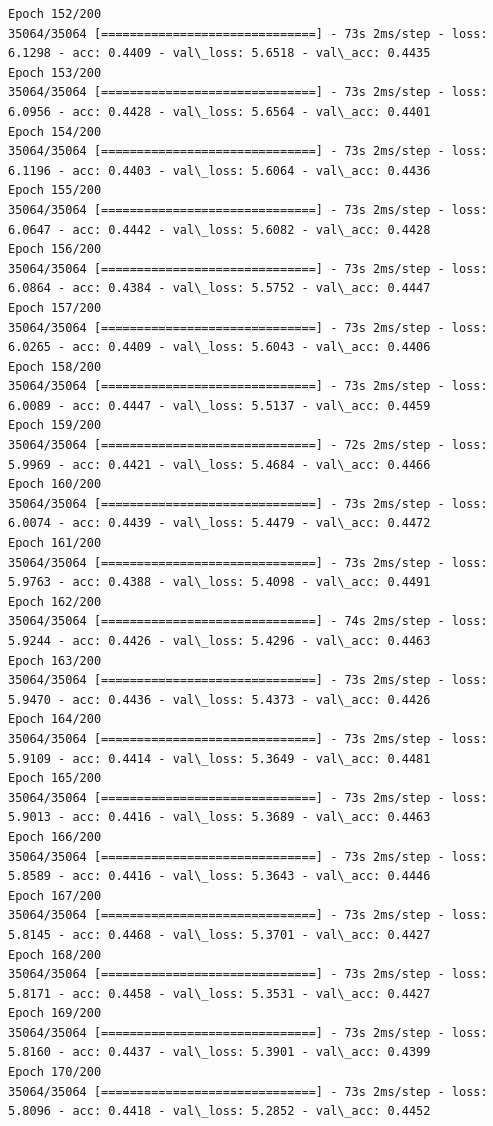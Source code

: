 \documentclass[11pt]{article}
\begin{document}
\begin{Verbatim}[commandchars=\\\{\}]
Epoch 152/200
35064/35064 [==============================] - 73s 2ms/step - loss: 6.1298 - acc: 0.4409 - val\_loss: 5.6518 - val\_acc: 0.4435
Epoch 153/200
35064/35064 [==============================] - 73s 2ms/step - loss: 6.0956 - acc: 0.4428 - val\_loss: 5.6564 - val\_acc: 0.4401
Epoch 154/200
35064/35064 [==============================] - 73s 2ms/step - loss: 6.1196 - acc: 0.4403 - val\_loss: 5.6064 - val\_acc: 0.4436
Epoch 155/200
35064/35064 [==============================] - 73s 2ms/step - loss: 6.0647 - acc: 0.4442 - val\_loss: 5.6082 - val\_acc: 0.4428
Epoch 156/200
35064/35064 [==============================] - 73s 2ms/step - loss: 6.0864 - acc: 0.4384 - val\_loss: 5.5752 - val\_acc: 0.4447
Epoch 157/200
35064/35064 [==============================] - 73s 2ms/step - loss: 6.0265 - acc: 0.4409 - val\_loss: 5.6043 - val\_acc: 0.4406
Epoch 158/200
35064/35064 [==============================] - 73s 2ms/step - loss: 6.0089 - acc: 0.4447 - val\_loss: 5.5137 - val\_acc: 0.4459
Epoch 159/200
35064/35064 [==============================] - 72s 2ms/step - loss: 5.9969 - acc: 0.4421 - val\_loss: 5.4684 - val\_acc: 0.4466
Epoch 160/200
35064/35064 [==============================] - 73s 2ms/step - loss: 6.0074 - acc: 0.4439 - val\_loss: 5.4479 - val\_acc: 0.4472
Epoch 161/200
35064/35064 [==============================] - 73s 2ms/step - loss: 5.9763 - acc: 0.4388 - val\_loss: 5.4098 - val\_acc: 0.4491
Epoch 162/200
35064/35064 [==============================] - 74s 2ms/step - loss: 5.9244 - acc: 0.4426 - val\_loss: 5.4296 - val\_acc: 0.4463
Epoch 163/200
35064/35064 [==============================] - 73s 2ms/step - loss: 5.9470 - acc: 0.4436 - val\_loss: 5.4373 - val\_acc: 0.4426
Epoch 164/200
35064/35064 [==============================] - 73s 2ms/step - loss: 5.9109 - acc: 0.4414 - val\_loss: 5.3649 - val\_acc: 0.4481
Epoch 165/200
35064/35064 [==============================] - 73s 2ms/step - loss: 5.9013 - acc: 0.4416 - val\_loss: 5.3689 - val\_acc: 0.4463
Epoch 166/200
35064/35064 [==============================] - 73s 2ms/step - loss: 5.8589 - acc: 0.4416 - val\_loss: 5.3643 - val\_acc: 0.4446
Epoch 167/200
35064/35064 [==============================] - 73s 2ms/step - loss: 5.8145 - acc: 0.4468 - val\_loss: 5.3701 - val\_acc: 0.4427
Epoch 168/200
35064/35064 [==============================] - 73s 2ms/step - loss: 5.8171 - acc: 0.4458 - val\_loss: 5.3531 - val\_acc: 0.4427
Epoch 169/200
35064/35064 [==============================] - 73s 2ms/step - loss: 5.8160 - acc: 0.4437 - val\_loss: 5.3901 - val\_acc: 0.4399
Epoch 170/200
35064/35064 [==============================] - 73s 2ms/step - loss: 5.8096 - acc: 0.4418 - val\_loss: 5.2852 - val\_acc: 0.4452

\end{Verbatim}
\end{document}
